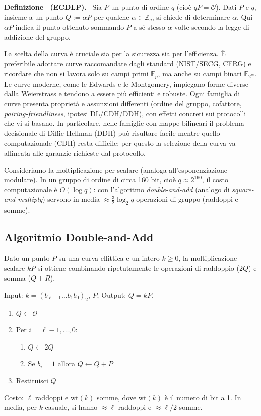 \documentclass[a4paper, 11pt]{article}
\newenvironment{definition}[1][]{
  \par\noindent\textbf{Definizione%
  \if\relax\detokenize{#1}\relax\else\ (\textbf{#1})\fi.}\ }{}
\begin{document}
\begin{definition}[ECDLP]
    Sia $P$ un punto di ordine $q$ (cioè $qP=\mathcal{O}$). Dati $P$ e $q$, insieme a un punto $Q:=\alpha P$ per qualche $\alpha \in \mathbb{Z}_q$, si chiede di determinare $\alpha$. Qui $\alpha P$ indica il punto ottenuto sommando $P$ a sé stesso $\alpha$ volte secondo la legge di addizione del gruppo.
\end{definition}

La scelta della curva è cruciale sia per la sicurezza sia per l'efficienza. È preferibile adottare curve raccomandate dagli standard (NIST/SECG, CFRG) e ricordare che non si lavora solo su campi primi $\mathbb{F}_p$, ma anche su campi binari $\mathbb{F}_{2^m}$. Le curve moderne, come le Edwards e le Montgomery, impiegano forme diverse dalla Weierstrass e tendono a essere più efficienti e robuste. Ogni famiglia di curve presenta proprietà e assunzioni differenti (ordine del gruppo, cofattore, \emph{pairing-friendliness}, ipotesi DL/CDH/DDH), con effetti concreti sui protocolli che vi si basano. In particolare, nelle famiglie con mappe bilineari il problema decisionale di Diffie-Hellman (DDH) può risultare facile mentre quello computazionale (CDH) resta difficile; per questo la selezione della curva va allineata alle garanzie richieste dal protocollo.

Consideriamo la moltiplicazione per scalare (analoga all'esponenziazione modulare). In un gruppo di ordine di circa 160 bit, cioè $q \approx 2^{160}$, il costo computazionale è $O(\log q)$: con l'algoritmo \textit{double-and-add} (analogo di \textit{square-and-multiply}) servono in media $\approx \tfrac{3}{2}\log_2 q$ operazioni di gruppo (raddoppi e somme).

\subsection{Algoritmio Double-and-Add}

Dato un punto $P$ su una curva ellittica e un intero $k\ge 0$, la moltiplicazione scalare $kP$ si ottiene combinando ripetutamente le operazioni di raddoppio ($2Q$) e somma ($Q+R$).

\begin{tcolorbox}[title=Double-and-Add (da sinistra a destra), colback=green!5, colframe=green!50!black]
Input: $k=(b_{\ell-1}\dots b_1b_0)_2$, $P$; Output: $Q=kP$.
\begin{enumerate}[leftmargin=*]
    \item $Q\leftarrow \mathcal{O}$
    \item Per $i=\ell-1,\dots,0$:
        \begin{enumerate}[leftmargin=*]
            \item $Q\leftarrow 2Q$
            \item Se $b_i=1$ allora $Q\leftarrow Q+P$
        \end{enumerate}
    \item Restituisci $Q$
\end{enumerate}
Costo: $\ell$ raddoppi e $\mathrm{wt}(k)$ somme, dove $\mathrm{wt}(k)$ è il numero di bit a 1. In media, per $k$ casuale, si hanno $\approx \ell$ raddoppi e $\approx \ell/2$ somme.
\end{tcolorbox}
\end{document}
